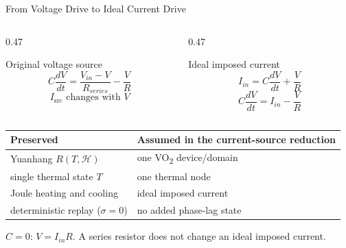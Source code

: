 \documentclass[aspectratio=169]{beamer}
\begin{document}
\begin{frame}{From Voltage Drive to Ideal Current Drive}

\begin{columns}[T,onlytextwidth]
\begin{column}{0.47\textwidth}
\begin{block}{Original voltage source}
\[
C\frac{dV}{dt}
=
\frac{V_{in}-V}{R_{series}}
-\frac{V}{R}
\]
\[
I_{\mathrm{src}} \text{ changes with } V
\]
\end{block}
\end{column}

\begin{column}{0.47\textwidth}
\begin{alertblock}{Ideal imposed current}
\[
I_{in}=C\frac{dV}{dt}+\frac{V}{R}
\]
\[
\boxed{
C\frac{dV}{dt}=I_{in}-\frac{V}{R}
}
\]
\end{alertblock}
\end{column}
\end{columns}

\vspace{0.05cm}

\begin{center}
\footnotesize
\begin{tabular}{ll}
\toprule
\textbf{Preserved} & \textbf{Assumed in the current-source reduction} \\
\midrule
Yuanhang \(R(T,\mathcal H)\) & one VO\textsubscript{2} device/domain \\
single thermal state \(T\) & one thermal node \\
Joule heating and cooling & ideal imposed current \\
deterministic replay (\(\sigma=0\)) & no added phase-lag state \\
\bottomrule
\end{tabular}
\end{center}

\vspace{0cm}
\begin{center}
\small \(C=0\): \(V=I_{in}R\). A series resistor does not change an ideal imposed current.
\end{center}

\end{frame}
\end{document}
